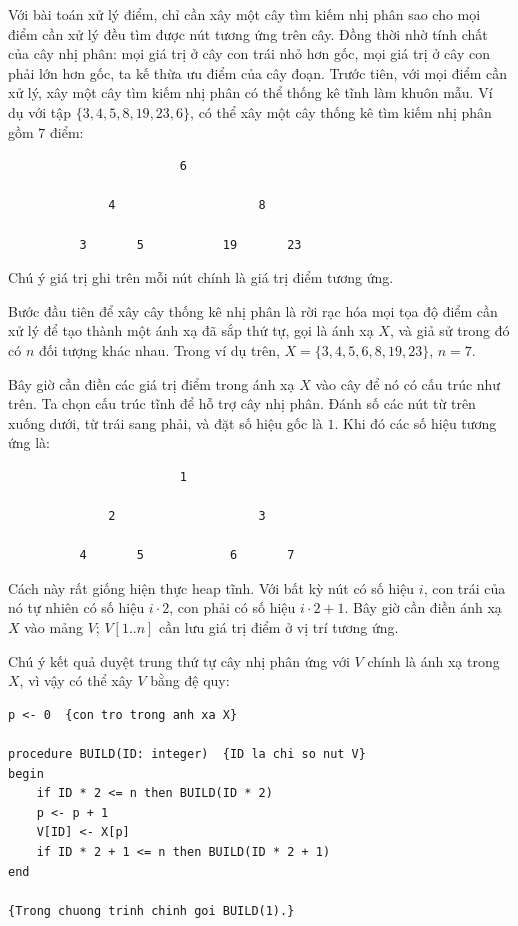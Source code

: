 \documentclass[11pt]{article}
\begin{document}
Với bài toán xử lý điểm, chỉ cần xây một cây tìm kiếm nhị phân sao cho mọi
điểm cần xử lý đều tìm được nút tương ứng trên cây. Đồng thời nhờ tính chất
của cây nhị phân: mọi giá trị ở cây con trái nhỏ hơn gốc, mọi giá trị ở cây
con phải lớn hơn gốc, ta kế thừa ưu điểm của cây đoạn. Trước tiên, với mọi
điểm cần xử lý, xây một cây tìm kiếm nhị phân có thể thống kê tĩnh làm khuôn
mẫu. Ví dụ với tập \(\{3,4,5,8,19,23,6\}\), có thể xây một cây thống kê tìm
kiếm nhị phân gồm \(7\) điểm:

\begin{verbatim}
                        6

              4                    8

          3       5           19       23
\end{verbatim}

Chú ý giá trị ghi trên mỗi nút chính là giá trị điểm tương ứng.

Bước đầu tiên để xây cây thống kê nhị phân là rời rạc hóa mọi tọa độ điểm cần
xử lý để tạo thành một ánh xạ đã sắp thứ tự, gọi là ánh xạ \(X\), và giả sử
trong đó có \(n\) đối tượng khác nhau. Trong ví dụ trên,
\(X=\{3,4,5,6,8,19,23\}\), \(n=7\).

Bây giờ cần điền các giá trị điểm trong ánh xạ \(X\) vào cây để nó có cấu trúc
như trên. Ta chọn cấu trúc tĩnh để hỗ trợ cây nhị phân. Đánh số các nút từ
trên xuống dưới, từ trái sang phải, và đặt số hiệu gốc là \(1\). Khi đó các
số hiệu tương ứng là:

\begin{verbatim}
                        1

              2                    3

          4       5            6       7
\end{verbatim}

Cách này rất giống hiện thực heap tĩnh. Với bất kỳ nút có số hiệu \(i\), con
trái của nó tự nhiên có số hiệu \(i\cdot 2\), con phải có số hiệu
\(i\cdot 2+1\). Bây giờ cần điền ánh xạ \(X\) vào mảng \(V\);
\(V[1..n]\) cần lưu giá trị điểm ở vị trí tương ứng.

Chú ý kết quả duyệt trung thứ tự cây nhị phân ứng với \(V\) chính là ánh xạ
trong \(X\), vì vậy có thể xây \(V\) bằng đệ quy:

\begin{verbatim}
p <- 0  {con tro trong anh xa X}

procedure BUILD(ID: integer)  {ID la chi so nut V}
begin
    if ID * 2 <= n then BUILD(ID * 2)
    p <- p + 1
    V[ID] <- X[p]
    if ID * 2 + 1 <= n then BUILD(ID * 2 + 1)
end

{Trong chuong trinh chinh goi BUILD(1).}
\end{verbatim}
\end{document}
